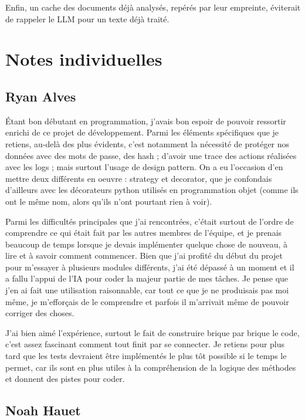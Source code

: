 \documentclass[12pt,a4paper]{article}
\begin{document}
Enfin, un cache des documents déjà analysés, repérés par leur empreinte, éviterait de rappeler le LLM pour un texte déjà traité.

\newpage
\section{Notes individuelles}

\subsection{Ryan Alves}

Étant bon débutant en programmation, j'avais bon espoir de pouvoir ressortir enrichi de ce projet de développement. Parmi les éléments spécifiques que je retiens, au-delà des plus évidents, c'est notamment la nécessité de protéger nos données avec des mots de passe, des hash ; d'avoir une trace des actions réalisées avec les logs ; mais surtout l'usage de design pattern. On a eu l'occasion d'en mettre deux différents en oeuvre : strategy et decorator, que je confondais d'ailleurs avec les décorateurs python utilisés en programmation objet (comme ils ont le même nom, alors qu'ils n'ont pourtant rien à voir).

Parmi les difficultés principales que j'ai rencontrées, c'était surtout de l'ordre de comprendre ce qui était fait par les autres membres de l'équipe, et je prenais beaucoup de temps lorsque je devais implémenter quelque chose de nouveau, à lire et à savoir comment commencer. Bien que j'ai profité du début du projet pour m'essayer à plusieurs modules différents, j'ai été dépassé à un moment et il a fallu l'appui de l'IA pour coder la majeur partie de mes tâches. Je pense que j'en ai fait une utilisation raisonnable, car tout ce que je ne produisais pas moi même, je m'efforçais de le comprendre et parfois il m'arrivait même de pouvoir corriger des choses.

J'ai bien aimé l'expérience, surtout le fait de construire brique par brique le code, c'est assez fascinant comment tout finit par se connecter. Je retiens pour plus tard que les tests devraient être implémentés le plus tôt possible si le temps le permet, car ils sont en plus utiles à la compréhension de la logique des méthodes et donnent des pistes pour coder.

\subsection{Noah Hauet}
\end{document}
